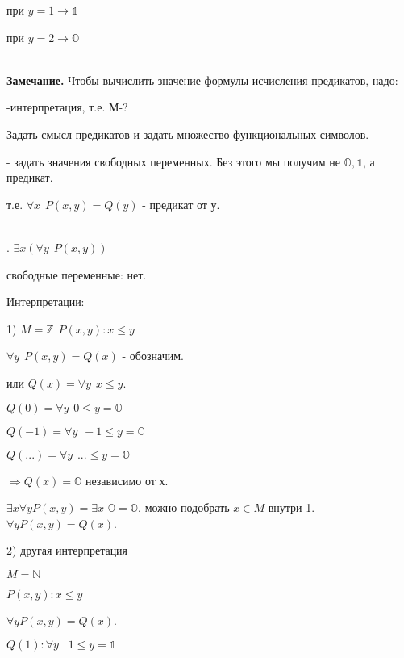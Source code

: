 \documentclass{article}
\begin{document}
при $y=1 \rightarrow \mathds{1}$

при $y=2 \rightarrow \mathds{O}$

~\\
\textbf{Замечание.} Чтобы вычислить значение формулы исчисления предикатов, надо:

\hspace{10pt}-интерпретация, т.е. М-?

Задать смысл предикатов и задать множество функциональных символов.

\hspace{10pt}- задать значения свободных переменных. Без этого мы получим не $\mathds{O}, \mathds{1}$, а предикат.

т.е. $\forall x \hspace{5pt} P(x,y) = Q(y)$ - предикат от у.

~\\
. $\exists x (\forall y \hspace{5pt} P(x,y))$

свободные переменные: нет.

Интерпретации:

1) $M=\mathds{Z} \hspace{5pt} P(x,y): x\leqslant y$

$\forall y \hspace{5pt} P(x,y)=Q(x)$ - обозначим. 

или $Q(x) = \forall y \hspace{5pt} x\leqslant y$.

$Q(0) = \forall y \hspace{5pt} 0\leqslant y = \mathds{O}$

$Q(-1) = \forall y \hspace{5pt} -1\leqslant y = \mathds{O}$

$Q(...) = \forall y \hspace{5pt} ...\leqslant y = \mathds{O}$

$\Rightarrow Q(x) =\mathds{O}$ независимо от х.

$\exists x \forall y P(x,y) = \exists x$  $\mathds{O}=\mathds{O}$. можно подобрать $x\in M$ внутри 1. $\forall y P(x,y) = Q(x)$.

2) другая интерпретация

$M=\mathds{N}$

$P(x,y): x\leqslant y$

$\forall y P(x,y) = Q(x)$.

$Q(1):\forall y \hspace{10pt} 1\leqslant y= \mathds{1}$
\end{document}

